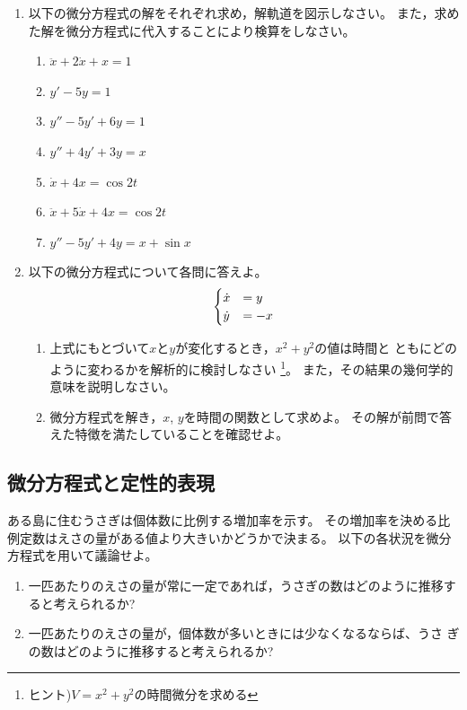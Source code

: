 \documentclass[twocolumn,11pt]{jarticle}
\begin{document}
\exercise
\begin{enumerate}
\item 以下の微分方程式の解をそれぞれ求め，解軌道を図示しなさい。
  また，求めた解を微分方程式に代入することにより検算をしなさい。
  \begin{enumerate}
  \item $\ddot{x}+2\dot{x}+x=1$
  \item $y'-5y=1$
  \item $y''-5y'+6y=1$
  \item $y''+4y'+3y=x$
  \item $\dot{x}+4x=\cos 2t$
  \item $\ddot{x}+5\dot{x}+4x=\cos 2t$
  \item $y''-5y'+4y=x+\sin x$
  \end{enumerate}
\item 以下の微分方程式について各問に答えよ。
  \begin{align}
    \begin{cases}
      \dot{x}&=y\\
      \dot{y}&=-x
    \end{cases}\notag
  \end{align}
  \begin{enumerate}
  \item 上式にもとづいて$x$と$y$が変化するとき，$x^2+y^2$の値は時間と
    ともにどのように変わるかを解析的に検討しなさい
    \footnote{ヒント)$V=x^2+y^2$の時間微分を求める}。
    また，その結果の幾何学的意味を説明しなさい。
  \item 微分方程式を解き，$x$, $y$を時間の関数として求めよ。
    その解が前問で答えた特徴を満たしていることを確認せよ。
  \end{enumerate}
\end{enumerate}


\subsection{微分方程式と定性的表現}
ある島に住むうさぎは個体数に比例する増加率を示す。
その増加率を決める比例定数はえさの量がある値より大きいかどうかで決まる。
以下の各状況を微分方程式を用いて議論せよ。
\begin{enumerate}
\item 一匹あたりのえさの量が常に一定であれば，うさぎの数はどのように推移す
  ると考えられるか?
\item 一匹あたりのえさの量が，個体数が多いときには少なくなるならば、うさ
  ぎの数はどのように推移すると考えられるか?
\end{enumerate}
\end{document}
